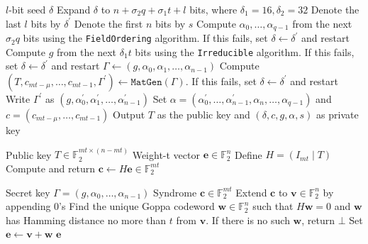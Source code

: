 \documentclass[runningheads]{llncs}
\begin{document}
\begin{algorithm}
    \caption{$\texttt{SeededKeyGen}(\delta)$}\label{alg:mceliece-seeded-keygen}
    \begin{algorithmic}[1]
        \Require $l$-bit seed $\delta$
        \State Expand $\delta$ to $n + \sigma_2 q + \sigma_1 t + l$ bits, where $\delta_1 = 16, \delta_2 = 32$
        \State Denote the last $l$ bits by $\delta^\prime$
        \State Denote the first $n$ bits by $s$
        \State Compute $\alpha_0, \ldots, \alpha_{q-1}$ from the next $\sigma_2 q$ bits using the \texttt{FieldOrdering} algorithm. If this fails, set $\delta \leftarrow \delta^\prime$ and restart
        \State Compute $g$ from the next $\delta_1 t$ bits using the \texttt{Irreducible} algorithm. If this fails, set $\delta \leftarrow \delta^\prime$ and restart
        \State $\Gamma \leftarrow (g, \alpha_0, \alpha_1, \ldots, \alpha_{n-1})$
        \State Compute $(T, c_{mt-\mu}, \ldots, c_{mt-1}, \Gamma^\prime) \leftarrow \texttt{MatGen}(\Gamma)$. If this fails, set $\delta \leftarrow \delta^\prime$ and restart
        \State Write $\Gamma^\prime$ as $(g, \alpha_0^\prime, \alpha_1^\prime, \ldots, \alpha_{n-1}^\prime)$
        \State Set $\alpha = (\alpha_0^\prime, \ldots, \alpha_{n-1}^\prime, \alpha_n, \ldots, \alpha_{q-1})$ and $c = (c_{mt-\mu}, \ldots, c_{mt-1})$
        \State Output $T$ as the public key and $(\delta, c, g, \alpha, s)$ as private key
    \end{algorithmic}
\end{algorithm}

\begin{algorithm}
    \caption{$\texttt{Encode}(T, \mathbf{e})$}\label{alg:mceliece-encode}
    \begin{algorithmic}[1]
        \Require Public key $T\in\mathbb{F}_2^{mt \times (n - mt)}$
        \Require Weight-t vector $\mathbf{e}\in\mathbb{F}_2^n$
        \State Define $H = (I_{mt} \mid T)$
        \State Compute and return $\mathbf{c} \leftarrow H\mathbf{e} \in \mathbb{F}_2^{mt}$
    \end{algorithmic}
\end{algorithm}

\begin{algorithm}
    \caption{$\texttt{Decode}(\Gamma, \mathbf{c})$}\label{alg:mceliece-decode}
    \begin{algorithmic}[1]
        \Require Secret key $\Gamma = (g, \alpha_0, \ldots, \alpha_{n-1})$
        \Require Syndrome $\mathbf{c}\in\mathbb{F}_2^{mt}$
        \State Extend $\mathbf{c}$ to $\mathbf{v} \in\mathbb{F}_2^n$ by appending 0's 
        \State Find the unique Goppa codeword $\mathbf{w}\in\mathbb{F}_2^n$ such that $H\mathbf{w} = 0$ and $\mathbf{w}$ has Hamming distance no more than $t$ from $\mathbf{v}$. If there is no such $\mathbf{w}$, return $\bot$
        \State Set $\mathbf{e} \leftarrow \mathbf{v} + \mathbf{w}$
        \State \Return $\mathbf{e}$
    \end{algorithmic}
\end{algorithm}
\end{document}
